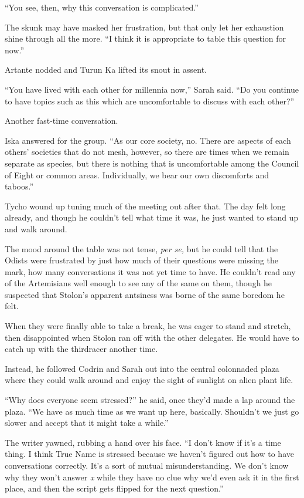 ``You see, then, why this conversation is complicated.''

The skunk may have masked her frustration, but that only let her exhaustion shine through all the more. ``I think it is appropriate to table this question for now.''

Artante nodded and Turun Ka lifted its snout in assent.

``You have lived with each other for millennia now,'' Sarah said. ``Do you continue to have topics such as this which are uncomfortable to discuss with each other?''

Another fast-time conversation.

Iska answered for the group. ``As our core society, no. There are aspects of each others' societies that do not mesh, however, so there are times when we remain separate as species, but there is nothing that is uncomfortable among the Council of Eight or common areas. Individually, we bear our own discomforts and taboos.''

Tycho wound up tuning much of the meeting out after that. The day felt long already, and though he couldn't tell what time it was, he just wanted to stand up and walk around.

The mood around the table was not tense, \emph{per se,} but he could tell that the Odists were frustrated by just how much of their questions were missing the mark, how many conversations it was not yet time to have. He couldn't read any of the Artemisians well enough to see any of the same on them, though he suspected that Stolon's apparent antsiness was borne of the same boredom he felt.

When they were finally able to take a break, he was eager to stand and stretch, then disappointed when Stolon ran off with the other delegates. He would have to catch up with the thirdracer another time.

Instead, he followed Codrin and Sarah out into the central colonnaded plaza where they could walk around and enjoy the sight of sunlight on alien plant life.

``Why does everyone seem stressed?'' he said, once they'd made a lap around the plaza. ``We have as much time as we want up here, basically. Shouldn't we just go slower and accept that it might take a while.''

The writer yawned, rubbing a hand over his face. ``I don't know if it's a time thing. I think True Name is stressed because we haven't figured out how to have conversations correctly. It's a sort of mutual misunderstanding. We don't know why they won't answer \emph{x} while they have no clue why we'd even ask it in the first place, and then the script gets flipped for the next question.''

